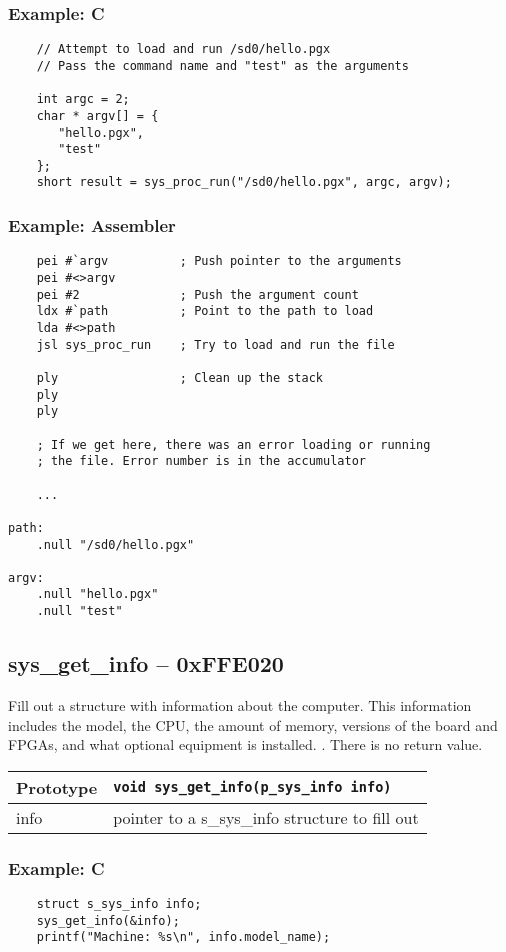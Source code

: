 \subsubsection*{Example: C}
\begin{lstlisting}
    // Attempt to load and run /sd0/hello.pgx
    // Pass the command name and "test" as the arguments

    int argc = 2;
    char * argv[] = {
       "hello.pgx",
       "test"
    };
    short result = sys_proc_run("/sd0/hello.pgx", argc, argv);
\end{lstlisting}

\subsubsection*{Example: Assembler}
\begin{verbatim}
    pei #`argv          ; Push pointer to the arguments
    pei #<>argv
    pei #2              ; Push the argument count
    ldx #`path          ; Point to the path to load
    lda #<>path
    jsl sys_proc_run    ; Try to load and run the file

    ply                 ; Clean up the stack
    ply
    ply

    ; If we get here, there was an error loading or running
    ; the file. Error number is in the accumulator

    ...

path:
    .null "/sd0/hello.pgx"

argv:
    .null "hello.pgx"
    .null "test"
\end{verbatim}


\subsection*{sys\_get\_info -- 0xFFE020}
Fill out a structure with information about the computer. This information includes the model, the CPU, the amount of memory,
versions of the board and FPGAs, and what optional equipment is installed.
.
There is no return value.

\bigskip

\begin{tabular}{|l||l|} \hline
Prototype & \lstinline!void sys_get_info(p_sys_info info)! \\ \hline
info & pointer to a s\_sys\_info structure to fill out \\ \hline
\end{tabular}

\subsubsection*{Example: C}
\begin{lstlisting}
    struct s_sys_info info;
    sys_get_info(&info);
    printf("Machine: %s\n", info.model_name);	
\end{lstlisting}

